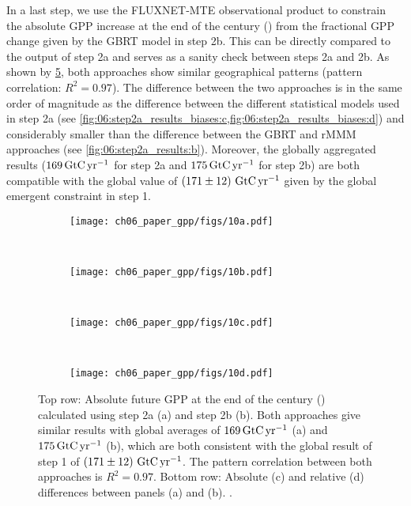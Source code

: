 In a last step, we use the FLUXNET‐MTE observational product to constrain the
absolute \ac{GPP} increase at the end of the  century
() from the fractional \ac{GPP} change given by the \ac{GBRT}
model in step 2b. This can be directly compared to the output of step 2a and
serves as a sanity check between steps 2a and 2b. As shown by
\cref{fig:06:comparison_step2a_step2b}, both approaches show similar
geographical patterns (pattern correlation: $R^2 = 0.97$). The difference
between the two approaches is in the same order of magnitude as the difference
between the different statistical models used in step 2a (see
\cref{fig:06:step2a_results_biases:c,fig:06:step2a_results_biases:d}) and
considerably smaller than the difference between the \ac{GBRT} and r\acs{MMM}
approaches (see \cref{fig:06:step2a_results:b}). Moreover, the globally
aggregated results ($169 \unit{\GtCyr{}}$ for step 2a and $175 \unit{\GtCyr{}}$
for step 2b) are both compatible with the global value of
$\pmrangeunit{171}{12}{\GtCyr{}}$ given by the global emergent constraint in
step 1.

\begin{figure}[t]
  \centering
  \begin{subfigure}[b]{\SubfigureWidth{}}
    \texttt{[image: ch06\_paper\_gpp/figs/10a.pdf]}
    \caption{}
    \label{fig:06:comparison_step2a_step2b:a}
  \end{subfigure}
  ~
  \begin{subfigure}[b]{\SubfigureWidth{}}
    \texttt{[image: ch06\_paper\_gpp/figs/10b.pdf]}
    \caption{}
    \label{fig:06:comparison_step2a_step2b:b}
  \end{subfigure}
  \\
  \begin{subfigure}[b]{\SubfigureWidth{}}
    \texttt{[image: ch06\_paper\_gpp/figs/10c.pdf]}
    \caption{}
    \label{fig:06:comparison_step2a_step2b:c}
  \end{subfigure}
  ~
  \begin{subfigure}[b]{\SubfigureWidth{}}
    \texttt{[image: ch06\_paper\_gpp/figs/10d.pdf]}
    \caption{}
    \label{fig:06:comparison_step2a_step2b:d}
  \end{subfigure}
  \caption[
    Comparison of our two independent approaches from step 2a and step 2b.
  ]{
    Top row: Absolute future \acf{GPP} at the end of the  century
    () calculated using step 2a (a) and step 2b (b). Both
    approaches give similar results with global averages of $169
    \unit{\GtCyr{}}$ (a) and $175 \unit{\GtCyr{}}$ (b), which are both
    consistent with the global result of step 1 of
    $\pmrangeunit{171}{12}{\GtCyr{}}$. The pattern correlation between both
    approaches is $R^2 = 0.97$. Bottom row: Absolute (c) and relative (d)
    differences between panels (a) and (b). .
  }
  \label{fig:06:comparison_step2a_step2b}
\end{figure}


